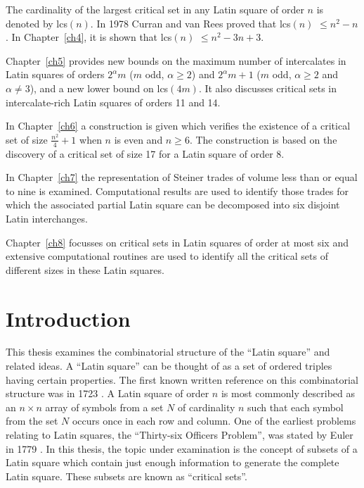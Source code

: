 \documentclass[12pt]{report}
\def\lcs#1{{\rm lcs}$(#1)$}
\begin{document}
The cardinality of the largest critical set in any Latin square of
order $n$ is denoted by \lcs{n}.  In 1978 Curran and van Rees proved
that \lcs{n} $\leq n^2 - n$.  In Chapter~\ref{ch4}, it is shown that \lcs{n}
$\leq n^2-3n+3$.

Chapter~\ref{ch5} provides new bounds on the maximum number of intercalates in
 Latin squares of orders $2^\alpha m$
($m$ odd, $\alpha \geq 2$) and $2^\alpha m + 1$ ($m$ odd, $\alpha \geq
2$ and $\alpha \neq 3$), and a new lower bound on \lcs{4m}.
It also discusses critical sets in intercalate-rich
Latin squares of orders 11 and 14.

In Chapter~\ref{ch6} a construction is given which verifies the existence of a critical 
set of size $\displaystyle{\frac{n^2}{4}} + 1$ when $n$ is even and $n \geq 6$.
The construction is based on the
discovery of a critical set of size 17 for a Latin square of order 8.

In Chapter~\ref{ch7} the representation of Steiner trades of volume less than
or equal to nine is examined.  Computational results are used to identify
those trades for which the associated partial
Latin square can be decomposed into six disjoint Latin interchanges.

Chapter~\ref{ch8} focusses on critical sets in Latin squares of order at most six and 
extensive computational routines are used to identify all the
critical sets of different sizes in these Latin squares.


\chapter{Introduction}\label{ch1}
This thesis examines the combinatorial structure of the ``Latin square''
and related ideas.  A ``Latin square'' can be thought of as a set of
ordered triples having certain properties.  The first known written
reference on this combinatorial structure was in
1723 \cite{dk}.  A Latin square of order $n$ is most commonly described
as an $n \times n$ array of symbols from a set $N$ of cardinality $n$
such that each symbol from the set $N$ occurs once in each row and
column.  One of the earliest problems relating to Latin squares, the
``Thirty-six Officers Problem'', was stated by Euler in 1779 \cite{dk}.
In this thesis, the topic under examination is the concept of subsets
of a Latin square which contain just enough information to generate the
complete Latin square.  These subsets are known as ``critical sets''.
\end{document}
